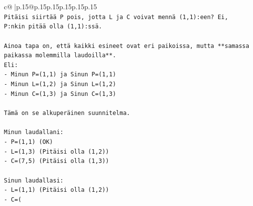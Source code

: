 \documentclass{article}
\begin{document}
{\begin{supertabular}{c@{$\;$}|p{.15\linewidth}@{}p{.15\linewidth}p{.15\linewidth}p{.15\linewidth}p{.15\linewidth}p{.15\linewidth}}
{{{\\ 
\texttt{Pitäisi siirtää P pois, jotta L ja C voivat mennä (1,1):een? Ei, P:nkin pitää olla (1,1):ssä.} \\
\\ 
\texttt{Ainoa tapa on, että kaikki esineet ovat eri paikoissa, mutta **samassa paikassa molemmilla laudoilla**.} \\
\texttt{Eli:} \\
\texttt{{-} Minun P=(1,1) ja Sinun P=(1,1)} \\
\texttt{{-} Minun L=(1,2) ja Sinun L=(1,2)} \\
\texttt{{-} Minun C=(1,3) ja Sinun C=(1,3)} \\
\\ 
\texttt{Tämä on se alkuperäinen suunnitelma.} \\
\\ 
\texttt{Minun laudallani:} \\
\texttt{{-} P=(1,1) (OK)} \\
\texttt{{-} L=(1,3) (Pitäisi olla (1,2))} \\
\texttt{{-} C=(7,5) (Pitäisi olla (1,3))} \\
\\ 
\texttt{Sinun laudallasi:} \\
\texttt{{-} L=(1,1) (Pitäisi olla (1,2))} \\
\texttt{{-} C=(} \\
            }
        }
    }
     \\ \\


\end{supertabular}}
\end{document}
